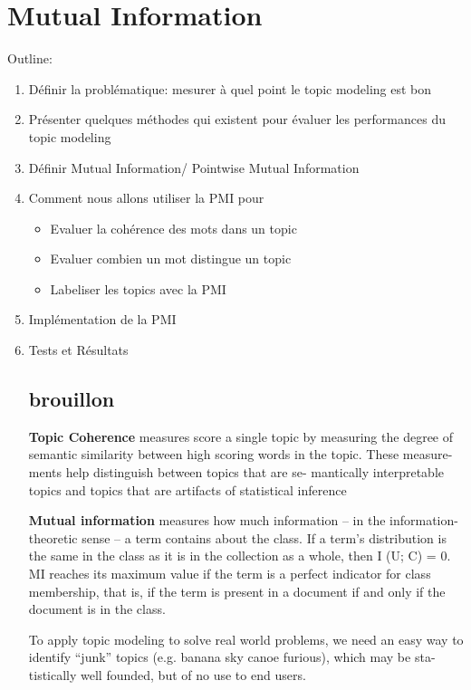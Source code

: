 \section{Mutual Information}

Outline: 

\begin{enumerate}
\item Définir la problématique: mesurer à quel point le topic modeling est bon

\item Présenter quelques méthodes qui existent pour évaluer les performances du topic modeling

\item Définir Mutual Information/ Pointwise Mutual Information

\item Comment nous allons utiliser la PMI pour 
	\begin{itemize}
		\item Evaluer la cohérence des mots dans un topic
		\item Evaluer combien un mot distingue un topic
		\item Labeliser les topics avec la PMI
	\end{itemize}

\item Implémentation de la PMI
\item Tests et Résultats 
	
	
\subsection{brouillon}

\textbf{Topic Coherence} measures score a single topic by measuring the degree of semantic similarity between
high scoring words in the topic.  These measure-
ments help distinguish between topics that are se-
mantically interpretable topics and topics that are artifacts of statistical inference \cite{Stevens:2012}

\textbf{Mutual information} measures how much information – in the information-
theoretic sense – a term contains about the class. If a term’s distribution is
the same in the class as it is in the collection as a whole, then I (U; C) =
0. MI reaches its maximum value if the term is a perfect indicator for class
membership, that is, if the term is present in a document if and only if the
document is in the class. \cite{schutze2008introduction}


 To apply topic modeling to solve
 real world problems, we need an easy way to identify “junk”
 topics (e.g. banana sky canoe furious), which may be sta-
 tistically well founded, but of no use to end users. 
 

\end{enumerate}
